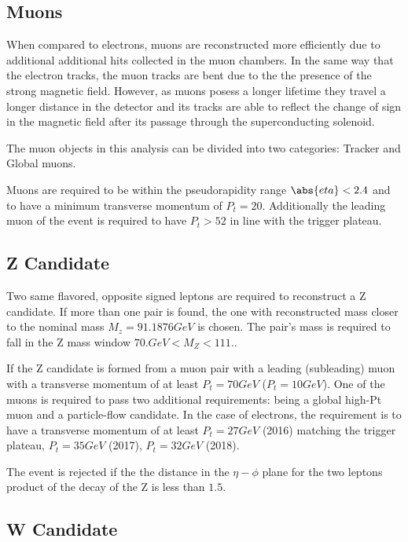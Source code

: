 \subsection{Muons}

When compared to electrons, muons are reconstructed more efficiently due to additional
additional hits collected in the muon chambers.
In the same way that the electron tracks, the muon tracks are bent due to the
the presence of the strong magnetic field. However, as
muons posess a longer lifetime they travel a longer distance in the detector and
its tracks are able to reflect the change of sign in the magnetic field after
its passage through the superconducting solenoid.

The muon objects in this analysis can be divided into two categories:
Tracker and Global muons.

Muons are required to be within the pseudorapidity range $\abs{eta}<2.4$ and
to have a minimum transverse momentum of $P_t=20$. Additionally the leading muon of
the event is required to have $P_t>52$ in line with the trigger plateau.


\subsection{Z Candidate}

Two same flavored, opposite signed leptons are required to reconstruct a Z
candidate. If more than one pair is found, the one with reconstructed mass
closer to the nominal mass $M_z= 91.1876 GeV$ is chosen. The pair's mass
is required to fall in the Z mass window $ 70. GeV < M_Z < 111. $.

If the Z candidate is formed from a muon pair with a leading (subleading) muon with
a transverse momentum of at least $P_t=70 GeV$ ($P_t=10GeV$). One of the
muons is required to pass two additional requirements: being a global high-Pt muon and a
particle-flow candidate. In the case of electrons, the requirement is to have
a transverse momentum of at least $P_t=27GeV$ (2016) matching the trigger
plateau, $P_t=35GeV$ (2017), $P_t=32GeV$ (2018).

The event is rejected if the the distance in the $\eta-\phi$ plane for the two
leptons product of the decay of the Z is less than $1.5$.




\subsection{W Candidate}

